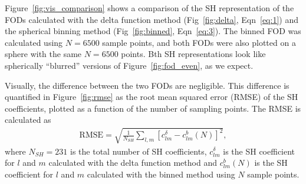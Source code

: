 \documentclass{article}
\begin{document}
Figure~\ref{fig:vis_comparison} shows a comparison of the SH representation of
the FODs calculated with the delta function method (Fig~\ref{fig:delta},
Eqn~\ref{eq:1}) and the spherical binning method (Fig~\ref{fig:binned},
Eqn~\ref{eq:3}). The binned FOD was calculated using $N=6500$ sample points, and
both FODs were also plotted on a sphere with the same $N=6500$ points. Bth SH
representations look like spherically ``blurred'' versions of
Figure~\ref{fig:fod_even}, as we expect.

Visually, the difference between the two FODs are negligible. This difference is
quantified in Figure~\ref{fig:rmse} as the root mean squared error (RMSE) of the
SH coefficients, plotted as a function of the number of sampling points. The RMSE is
calculated as
\begin{align}
  \label{eq:rmse}
  \text{RMSE} = \sqrt{\frac{1}{N_{SH}}\sum_{l,m} \left[c_{lm}^{\delta} - c_{lm}^{b}(N)\right]^2},
\end{align}
where $N_{SH}=231$ is the total number of SH coefficients,
$c_{lm}^{\delta}$ is the SH coefficient for $l$ and $m$ calculated with the delta
function method and $c_{lm}^b(N)$ is the SH coefficient for $l$ and $m$ calculated
with the binned method using $N$ sample points.
\end{document}
